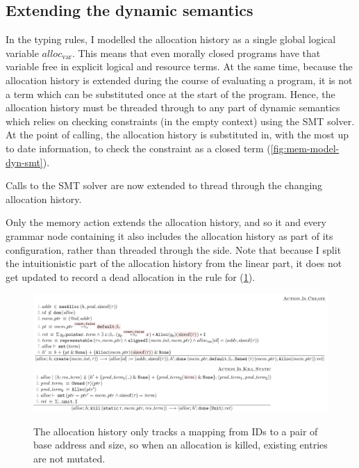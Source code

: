 \subsection{Extending the dynamic semantics}

In the typing rules, I modelled the allocation history as a single global
logical variable $\mathit{alloc}_\mathrm{var}$. This means that even morally
closed programs have that variable free in explicit logical and resource terms.
At the same time, because the allocation history is extended during the course
of evaluating a  program, it is not a term which can be substituted
once at the start of the program. Hence, the allocation history must
be threaded through to any part of dynamic semantics which relies on checking
constraints (in the empty context) using the SMT solver. At the point of
calling, the allocation history is substituted in, with the most up to date
information, to check the constraint as a closed term (\cref{fig:mem-model-dyn-smt}).

\begin{marginfigure}
    \small%
    \cndefnSubsXXSMT{}
    \caption{Calls to the SMT solver are now extended to thread through the
        changing allocation history.}\label{fig:mem-model-dyn-smt}
\end{marginfigure}

Only the  memory action extends the allocation history, and
so it and every grammar node containing it also includes the allocation history
as part of its configuration, rather than threaded through the
side. Note that
because I split the intuitionistic part of the allocation history from the
linear part, it does not get updated to record a dead allocation in the
rule for  (\cref{fig:mem-model-dyn-create-kill}).

\begin{figure}
    \includegraphics{figures/mem-model-dyn-create}
    \includegraphics{figures/mem-model-dyn-kill}
    \caption{The allocation history only tracks a mapping from IDs to a pair of
        base address and size, so when an allocation is killed, existing entries
        are not mutated.}\label{fig:mem-model-dyn-create-kill}
\end{figure}

